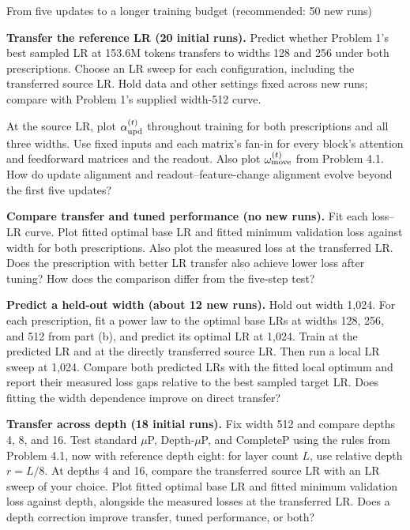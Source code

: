 \begin{problem}{From five updates to a longer training budget (recommended: 50 new runs)}
\begin{parts}
\item \textbf{Transfer the reference LR (20 initial runs).}
Predict whether Problem 1's best sampled LR at 153.6M tokens transfers to
widths 128 and 256 under both prescriptions. Choose an LR sweep for each
configuration, including the transferred source LR.
Hold data and other settings fixed across new runs; compare with Problem 1's
supplied width-512 curve.

At the source LR, plot $\alpha_{\rm upd}^{(t)}$ throughout training for both
prescriptions and all three widths. Use fixed inputs and each matrix's fan-in
for every block's attention and feedforward matrices and the readout.
Also plot $\omega_{\rm move}^{(t)}$ from Problem 4.1. How do update alignment
and readout--feature-change alignment evolve beyond the first five updates?

\item \textbf{Compare transfer and tuned performance (no new runs).}
Fit each loss--LR curve. Plot fitted optimal base LR and fitted minimum validation
loss against width for both prescriptions. Also plot the measured loss at the
transferred LR. Does the prescription with better LR transfer also achieve lower
loss after tuning? How does the comparison differ from the five-step test?

\item \textbf{Predict a held-out width (about 12 new runs).}
Hold out width 1,024. For each prescription, fit a power law to the optimal base
LRs at widths 128, 256, and 512 from part (b), and predict its optimal LR at 1,024.
Train at the predicted LR and at the directly transferred source LR. Then run a
local LR sweep at 1,024. Compare both predicted LRs with the fitted local optimum and
report their measured loss gaps relative to the best sampled target LR. Does fitting the width dependence improve on
direct transfer?

\item \textbf{Transfer across depth (18 initial runs).}
Fix width 512 and compare depths 4, 8, and 16. Test standard $\mu$P,
Depth-$\mu$P, and CompleteP using the rules from Problem 4.1, now with reference
depth eight: for layer count $L$, use relative depth $r=L/8$.
At depths 4 and 16, compare the transferred source LR with an LR sweep of
your choice. Plot fitted optimal base LR and fitted minimum
validation loss against depth, alongside the measured losses at the transferred
LR. Does a depth correction improve transfer, tuned performance, or both?


\end{parts}
\end{problem}
